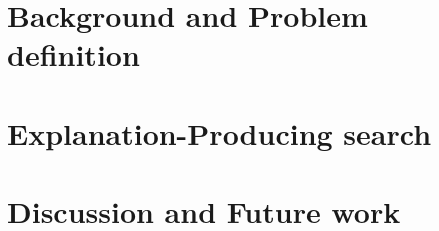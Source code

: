 \documentclass{llncs}
\begin{document}
\section{Background and Problem definition}\label{sec:background}

\section{Explanation-Producing search}\label{sec:explanation}

\section{Discussion and Future work}\label{sec:experiments}

% 
%
%


\end{document}
